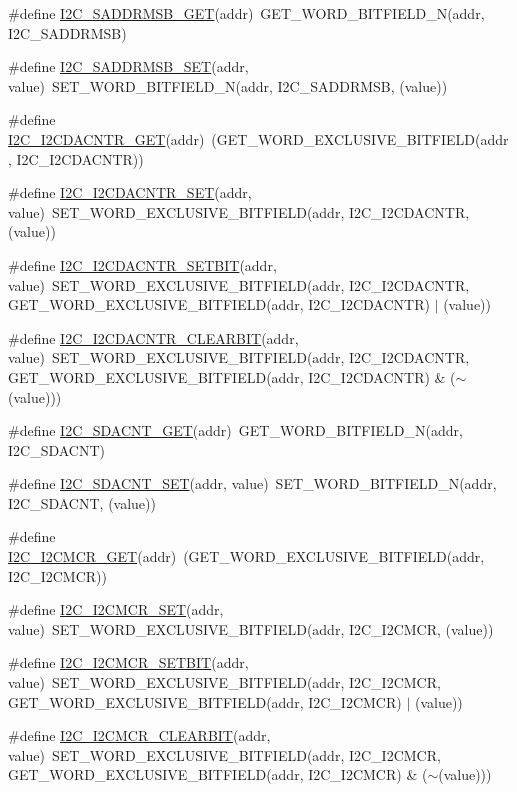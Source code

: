 \begin{DoxyCompactItemize}
\item 
\#define \hyperlink{a00557_a028c22c4f45ab4afe67db915c1b5470d}{I2C\_\-SADDRMSB\_\-GET}(addr)~GET\_\-WORD\_\-BITFIELD\_\-N(addr, I2C\_\-SADDRMSB)
\item 
\#define \hyperlink{a00557_a8f90c2257f55c950c78f4d5cfc7a2bcc}{I2C\_\-SADDRMSB\_\-SET}(addr, value)~SET\_\-WORD\_\-BITFIELD\_\-N(addr, I2C\_\-SADDRMSB, (value))
\item 
\#define \hyperlink{a00557_a75cba065bd14a4538de96443831700b1}{I2C\_\-I2CDACNTR\_\-GET}(addr)~(GET\_\-WORD\_\-EXCLUSIVE\_\-BITFIELD(addr, I2C\_\-I2CDACNTR))
\item 
\#define \hyperlink{a00557_a7ec11053a59653070d3486d755c68e58}{I2C\_\-I2CDACNTR\_\-SET}(addr, value)~SET\_\-WORD\_\-EXCLUSIVE\_\-BITFIELD(addr, I2C\_\-I2CDACNTR, (value))
\item 
\#define \hyperlink{a00557_a8637501292f196be88a7c2eb66c8b339}{I2C\_\-I2CDACNTR\_\-SETBIT}(addr, value)~SET\_\-WORD\_\-EXCLUSIVE\_\-BITFIELD(addr, I2C\_\-I2CDACNTR, GET\_\-WORD\_\-EXCLUSIVE\_\-BITFIELD(addr, I2C\_\-I2CDACNTR) $|$ (value))
\item 
\#define \hyperlink{a00557_a28e15fab811cb025a2592701540d47e3}{I2C\_\-I2CDACNTR\_\-CLEARBIT}(addr, value)~SET\_\-WORD\_\-EXCLUSIVE\_\-BITFIELD(addr, I2C\_\-I2CDACNTR, GET\_\-WORD\_\-EXCLUSIVE\_\-BITFIELD(addr, I2C\_\-I2CDACNTR) \& ($\sim$(value)))
\item 
\#define \hyperlink{a00557_aad7bea7abe15582f3ebd2634d563500e}{I2C\_\-SDACNT\_\-GET}(addr)~GET\_\-WORD\_\-BITFIELD\_\-N(addr, I2C\_\-SDACNT)
\item 
\#define \hyperlink{a00557_ad68f96139a457db2ee866b0e5ebd1076}{I2C\_\-SDACNT\_\-SET}(addr, value)~SET\_\-WORD\_\-BITFIELD\_\-N(addr, I2C\_\-SDACNT, (value))
\item 
\#define \hyperlink{a00557_a45191201f41d29d637195abfabf08914}{I2C\_\-I2CMCR\_\-GET}(addr)~(GET\_\-WORD\_\-EXCLUSIVE\_\-BITFIELD(addr, I2C\_\-I2CMCR))
\item 
\#define \hyperlink{a00557_a28f67409f8a0a2020bd510e5d49525ae}{I2C\_\-I2CMCR\_\-SET}(addr, value)~SET\_\-WORD\_\-EXCLUSIVE\_\-BITFIELD(addr, I2C\_\-I2CMCR, (value))
\item 
\#define \hyperlink{a00557_a342032ce78ac85bfe5edb9eddbe89079}{I2C\_\-I2CMCR\_\-SETBIT}(addr, value)~SET\_\-WORD\_\-EXCLUSIVE\_\-BITFIELD(addr, I2C\_\-I2CMCR, GET\_\-WORD\_\-EXCLUSIVE\_\-BITFIELD(addr, I2C\_\-I2CMCR) $|$ (value))
\item 
\#define \hyperlink{a00557_a737eaf86494321643708c504d59d4c59}{I2C\_\-I2CMCR\_\-CLEARBIT}(addr, value)~SET\_\-WORD\_\-EXCLUSIVE\_\-BITFIELD(addr, I2C\_\-I2CMCR, GET\_\-WORD\_\-EXCLUSIVE\_\-BITFIELD(addr, I2C\_\-I2CMCR) \& ($\sim$(value)))

\end{DoxyCompactItemize}
